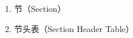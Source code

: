\begin{enumerate} [label=\arabic*)]
\item 节（Section）



\item 节头表（Section Header Table）



\end{enumerate}


